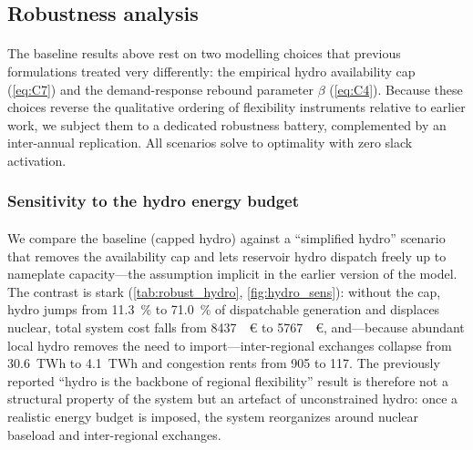 \documentclass[12pt]{article}
\newcommand{\EURM}[1]{\SI{#1}{\mega\euro}} %
\begin{document}
\subsection{Robustness analysis}
\label{subsec:robustness}

\paragraph{}
The baseline results above rest on two modelling choices that previous formulations treated very differently: the empirical hydro availability cap (\cref{eq:C7}) and the demand-response rebound parameter $\beta$ (\cref{eq:C4}). Because these choices reverse the qualitative ordering of flexibility instruments relative to earlier work, we subject them to a dedicated robustness battery, complemented by an inter-annual replication. All scenarios solve to optimality with zero slack activation.

\subsubsection{Sensitivity to the hydro energy budget}
\label{subsec:robust_hydro}

\paragraph{}
We compare the baseline (capped hydro) against a ``simplified hydro'' scenario that removes the availability cap and lets reservoir hydro dispatch freely up to nameplate capacity---the assumption implicit in the earlier version of the model. The contrast is stark (\cref{tab:robust_hydro}, \cref{fig:hydro_sens}): without the cap, hydro jumps from \SI{11.3}{\percent} to \SI{71.0}{\percent} of dispatchable generation and displaces nuclear, total system cost falls from \EURM{8437} to \EURM{5767}, and---because abundant local hydro removes the need to import---inter-regional exchanges collapse from \SI{30.6}{TWh} to \SI{4.1}{TWh} and congestion rents from \SI{905}{\MEUR} to \SI{117}{\MEUR}. The previously reported ``hydro is the backbone of regional flexibility'' result is therefore not a structural property of the system but an artefact of unconstrained hydro: once a realistic energy budget is imposed, the system reorganizes around nuclear baseload and inter-regional exchanges.
\end{document}
